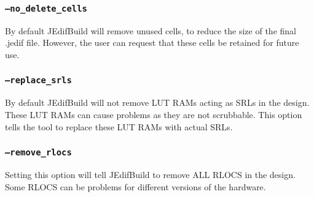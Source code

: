 \subsubsection{\texttt{--no\_delete\_cells}}
By default JEdifBuild will remove unused cells, to reduce the size of the final
.jedif file. However, the user can request that these cells be retained for 
future use.

\subsubsection{\texttt{--replace\_srls}}
By default JEdifBuild will not remove LUT RAMs acting as SRLs in the design.  These
LUT RAMs can cause problems as they are not scrubbable.  This option tells the 
tool to replace these LUT RAMs with actual SRLs.

\subsubsection{\texttt{--remove\_rlocs}}
Setting this option will tell JEdifBuild to remove ALL RLOCS in the design.  Some
RLOCS can be problems for different versions of the hardware.

%
%



